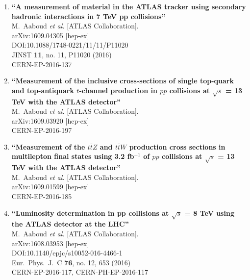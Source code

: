 \documentclass{article}
\begin{document}
\begin{enumerate}
\item%
{\bf ``A measurement of material in the ATLAS tracker using secondary hadronic interactions in 7 TeV pp collisions''}
  \\{}M.~Aaboud {\it et al.} [ATLAS Collaboration].
  \\{}arXiv:1609.04305 [hep-ex]
  \\{}DOI:10.1088/1748-0221/11/11/P11020
  \\{}JINST {\bf 11}, no. 11, P11020 (2016)
  \\{}CERN-EP-2016-137
\item%
{\bf ``Measurement of the inclusive cross-sections of single top-quark and top-antiquark $t$-channel production in $pp$ collisions at $\sqrt{s}$ = 13 TeV with the ATLAS detector''}
  \\{}M.~Aaboud {\it et al.} [ATLAS Collaboration].
  \\{}arXiv:1609.03920 [hep-ex]
  \\{}CERN-EP-2016-197
\item%
{\bf ``Measurement of the $t\bar{t}Z$ and $t\bar{t}W$ production cross sections in multilepton final states using 3.2 fb$^{-1}$ of $pp$ collisions at $\sqrt{s}$ = 13 TeV with the ATLAS detector''}
  \\{}M.~Aaboud {\it et al.} [ATLAS Collaboration].
  \\{}arXiv:1609.01599 [hep-ex]
  \\{}CERN-EP-2016-185
\item%
{\bf ``Luminosity determination in pp collisions at $\sqrt{s}$ = 8 TeV using the ATLAS detector at the LHC''}
  \\{}M.~Aaboud {\it et al.} [ATLAS Collaboration].
  \\{}arXiv:1608.03953 [hep-ex]
  \\{}DOI:10.1140/epjc/s10052-016-4466-1
  \\{}Eur.\ Phys.\ J.\ C {\bf 76}, no. 12, 653 (2016)
  \\{}CERN-EP-2016-117, CERN-PH-EP-2016-117

\end{enumerate}
\end{document}
